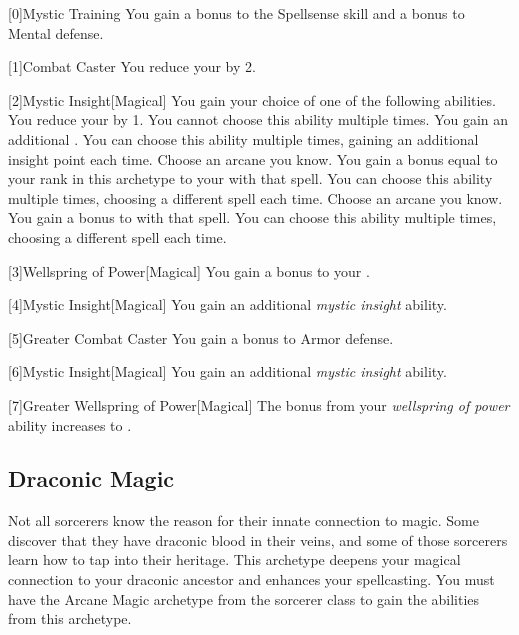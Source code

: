         [0]{Mystic Training} You gain a  bonus to the Spellsense skill and a  bonus to Mental defense.

        [1]{Combat Caster} You reduce your  by 2.

        [2]{Mystic Insight}[Magical]
        You gain your choice of one of the following abilities.
        {
             You reduce your  by 1.
                You cannot choose this ability multiple times.
             You gain an additional .
                You can choose this ability multiple times, gaining an additional insight point each time.
             Choose an arcane  you know.
                You gain a bonus equal to your rank in this archetype to your  with that spell.
                You can choose this ability multiple times, choosing a different spell each time.
             Choose an arcane  you know.
                You gain a  bonus to  with that spell.
                You can choose this ability multiple times, choosing a different spell each time.
        }

        [3]{Wellspring of Power}[Magical]
        You gain a  bonus to your  .

        [4]{Mystic Insight}[Magical]
        You gain an additional \textit{mystic insight} ability.

        [5]{Greater Combat Caster} You gain a  bonus to Armor defense.

        [6]{Mystic Insight}[Magical]
        You gain an additional \textit{mystic insight} ability.

        [7]{Greater Wellspring of Power}[Magical]
        The bonus from your \textit{wellspring of power} ability increases to .

    \newpage
    \subsection{Draconic Magic}
        Not all sorcerers know the reason for their innate connection to magic.
        Some discover that they have draconic blood in their veins, and some of those sorcerers learn how to tap into their heritage.
        This archetype deepens your magical connection to your draconic ancestor and enhances your spellcasting.
        You must have the Arcane Magic archetype from the sorcerer class to gain the abilities from this archetype.


